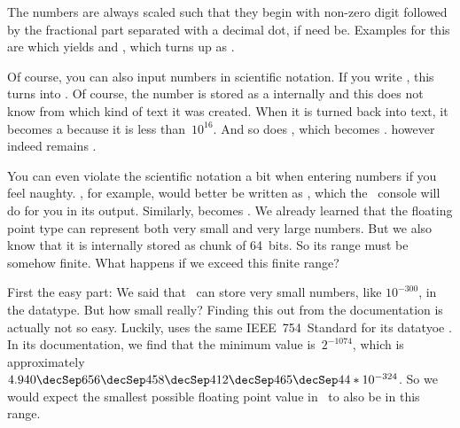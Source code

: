 The numbers are always scaled such that they begin with non-zero digit followed by the fractional part separated with a decimal dot, if need be.
Examples for this are  which yields  and , which turns up as .

Of course, you can also input numbers in scientific notation.
If you write , this turns into .
Of course, the number is stored as a  internally and this  does not know from which kind of text it was created.
When it is turned back into text, it becomes a  because it is less than~$10^{16}$.
And so does , which becomes .
 however indeed remains .

You can even violate the scientific notation a bit when entering numbers if you feel naughty.
, for example, would better be written as , which the \python\ console will do for you in its output.
Similarly,  becomes .%
\FloatBarrier%
\endhsection%
%
%
\label{sec:float:special}%
%
%
%
%
%
We already learned that the floating point type  can represent both very small and very large numbers.
But we also know that it is internally stored as chunk of 64~bits.
So its range must be somehow finite.
What happens if we exceed this finite range?

First the easy part:
We said that \python\ can store very small numbers, like $10^{-300}$, in the  datatype.
But how small really?
Finding this out from the documentation is actually not so easy.
Luckily,  uses the same IEEE~754~Standard\cite{IEEE2019ISFFPA} for its datatyoe .
In its documentation, we find that the minimum value is~$2^{-1074}$, which is approximately~$4.940\decSep656\decSep458\decSep412\decSep465\decSep44*10^{-324}$.
So we would expect the smallest possible floating point value in \python\ to also be in this range.

